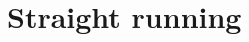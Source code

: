 \section{Straight running}
%
\begin{figure}[ht!]
    \centering
    \caption{}
    \label{fig:Straight}
\end{figure}
%